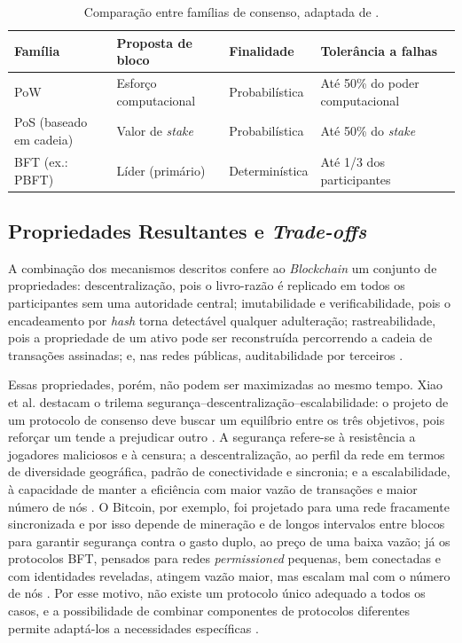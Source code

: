 \begin{table}[!hbtp]
    \centering
    \small
    \caption{Comparação entre famílias de consenso, adaptada de \cite{Xiao2020}.}
    \label{tab:consenso}
    \begin{tabular}{p{1.6cm} p{2.1cm} p{1.9cm} p{2.2cm}}
        \hline
        \textbf{Família} & \textbf{Proposta de bloco} & \textbf{Finalidade} & \textbf{Tolerância a falhas} \\
        \hline
        PoW & Esforço computacional & Probabilística & Até 50\% do poder computacional \\
        PoS (baseado em cadeia) & Valor de \textit{stake} & Probabilística & Até 50\% do \textit{stake} \\
        BFT (ex.: PBFT) & Líder (primário) & Determinística & Até 1/3 dos participantes \\
        \hline
    \end{tabular}
\end{table}

\subsection{Propriedades Resultantes e \textit{Trade-offs}}
\label{subsec:propriedades}

A combinação dos mecanismos descritos confere ao \textit{Blockchain} um conjunto de propriedades: descentralização, pois o livro-razão é replicado em todos os participantes sem uma autoridade central; imutabilidade e verificabilidade, pois o encadeamento por \textit{hash} torna detectável qualquer adulteração; rastreabilidade, pois a propriedade de um ativo pode ser reconstruída percorrendo a cadeia de transações assinadas; e, nas redes públicas, auditabilidade por terceiros \cite{di2017blockchain,Xiao2020}.

Essas propriedades, porém, não podem ser maximizadas ao mesmo tempo. Xiao et al. destacam o trilema segurança--descentralização--escalabilidade: o projeto de um protocolo de consenso deve buscar um equilíbrio entre os três objetivos, pois reforçar um tende a prejudicar outro \cite{Xiao2020}. A segurança refere-se à resistência a jogadores maliciosos e à censura; a descentralização, ao perfil da rede em termos de diversidade geográfica, padrão de conectividade e sincronia; e a escalabilidade, à capacidade de manter a eficiência com maior vazão de transações e maior número de nós \cite{Xiao2020}. O Bitcoin, por exemplo, foi projetado para uma rede fracamente sincronizada e por isso depende de mineração e de longos intervalos entre blocos para garantir segurança contra o gasto duplo, ao preço de uma baixa vazão; já os protocolos BFT, pensados para redes \textit{permissioned} pequenas, bem conectadas e com identidades reveladas, atingem vazão maior, mas escalam mal com o número de nós \cite{Xiao2020}. Por esse motivo, não existe um protocolo único adequado a todos os casos, e a possibilidade de combinar componentes de protocolos diferentes permite adaptá-los a necessidades específicas \cite{Xiao2020}.

